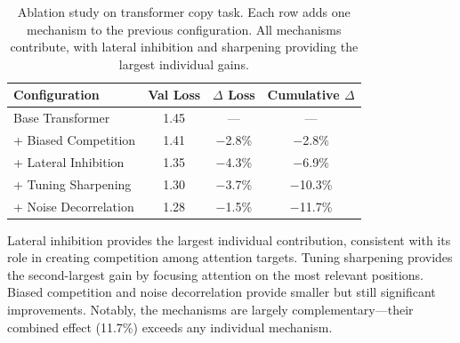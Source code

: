 \begin{table}[ht]
\centering
\caption{Ablation study on transformer copy task. Each row adds one mechanism to the previous configuration. All mechanisms contribute, with lateral inhibition and sharpening providing the largest individual gains.}
\label{tab:ablation}
\begin{tabular}{lccc}
\toprule
Configuration & Val Loss & $\Delta$ Loss & Cumulative $\Delta$ \\
\midrule
Base Transformer & 1.45 & --- & --- \\
+ Biased Competition & 1.41 & $-$2.8\% & $-$2.8\% \\
+ Lateral Inhibition & 1.35 & $-$4.3\% & $-$6.9\% \\
+ Tuning Sharpening & 1.30 & $-$3.7\% & $-$10.3\% \\
+ Noise Decorrelation & 1.28 & $-$1.5\% & $-$11.7\% \\
\bottomrule
\end{tabular}
\end{table}

Lateral inhibition provides the largest individual contribution, consistent with its role in creating competition among attention targets. Tuning sharpening provides the second-largest gain by focusing attention on the most relevant positions. Biased competition and noise decorrelation provide smaller but still significant improvements. Notably, the mechanisms are largely complementary---their combined effect (11.7\%) exceeds any individual mechanism.
